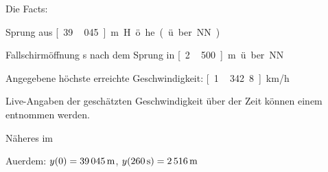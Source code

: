 
\pagestyle{empty}



\begin{landscape}
\begin{center}



\vspace{1ex}

\vspace{1em}

Die Facts:
\vspace{1em}

\hspace{0.3\textwidth}
\parbox{0.9\textwidth}{
\bi
\item Sprung aus \unit[39\,045]{m} H\"ohe (\"uber NN)
\item Fallschirm\"offnung \unit[260]{s} nach dem Sprung in
  \unit[2\,500]{m} \"uber NN
\item Angegebene h\"ochste erreichte Geschwindigkeit: \unit[1\,342.8]{km/h}
\item Live-Angaben der gesch\"atzten Geschwindigkeit \"uber der Zeit
  k\"onnen einem
  entnommen werden.
\item N\"aheres im
\ei
}

\newpage

\vspace{1ex}

Au\3erdem: $y(0)=\unit[39\,045]{m}$, 
$y(\unit[260]{s})=\unit[2\,516]{m}$



\newpage

\vspace{1ex}


\vspace{1em}


\end{center}
\end{landscape}
